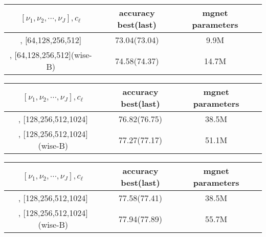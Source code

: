 \begin{enumerate}
\begin{table}[!htbp]
	\begin{center}
			\begin{tabular}{|c|c|c|c|}
                \hline
				$[\nu_1,\nu_2,\cdots,\nu_J], c_\ell$   &  accuracy best(last)  & mgnet parameters \tabularnewline
				\hline
				[2,2,4,2], [64,128,256,512]            &  73.04(73.04)         &     9.9M         \tabularnewline
				\hline		
				[2,2,4,2], [64,128,256,512](wise-B)    &  74.58(74.37)         &     14.7M        \tabularnewline
				\hline
			\end{tabular}
	\end{center}
\end{table}


\begin{table}[!htbp]
	\begin{center}
			\begin{tabular}{|c|c|c|c|}
                \hline
				$[\nu_1,\nu_2,\cdots,\nu_J], c_\ell$   &  accuracy best(last)  & mgnet parameters \tabularnewline
				\hline
				[2,2,2,2], [128,256,512,1024]          &  76.82(76.75)         &     38.5M        \tabularnewline
				\hline		
				[2,2,2,2], [128,256,512,1024](wise-B)  &  77.27(77.17)         &     51.1M        \tabularnewline
				\hline
			\end{tabular}
	\end{center}
\end{table}

\begin{table}[!htbp]
	\begin{center}
			\begin{tabular}{|c|c|c|c|}
                \hline
				$[\nu_1,\nu_2,\cdots,\nu_J], c_\ell$   &  accuracy best(last)  & mgnet parameters \tabularnewline
				\hline
				[2,2,4,2], [128,256,512,1024]            &  77.58(77.41)         &     38.5M         \tabularnewline
				\hline		
				[2,2,4,2], [128,256,512,1024](wise-B)    &  77.94(77.89)         &     55.7M        \tabularnewline
				\hline
			\end{tabular}
	\end{center}
\end{table}
\end{enumerate}

\newpage
